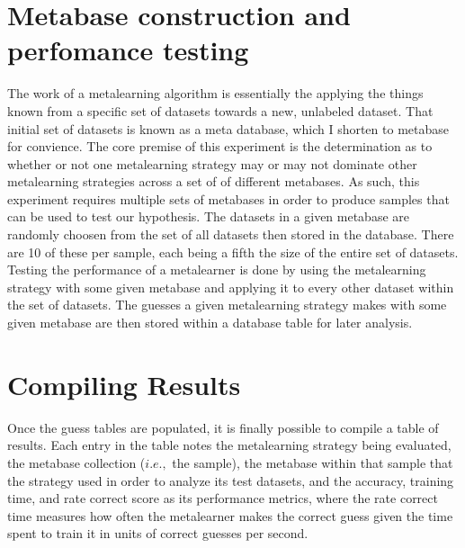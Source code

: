 \section{Metabase construction and perfomance testing}
The work of a metalearning algorithm is essentially the applying the things
known from a specific set of datasets towards a new, unlabeled dataset. That
initial set of datasets is known as a meta database, which I shorten to metabase
for convience. The core premise of this experiment is the determination as to
whether or not one metalearning strategy may or may not dominate other
metalearning strategies across a set of of different metabases. As such, this
experiment requires multiple sets of metabases in order to produce samples
that can be used to test our hypothesis. The datasets in a given metabase are
randomly choosen from the set of all datasets then stored in the database. There
are 10 of these per sample, each being a fifth the size of the entire set of
datasets. Testing the performance of a metalearner is done by using the
metalearning strategy with some given metabase and applying it to every other
dataset within the set of datasets. The guesses a given metalearning strategy
makes with some given metabase are then stored within a database table for later
analysis.

\section{Compiling Results}
Once the guess tables are populated, it is finally possible to compile a table
of results. Each entry in the table notes the metalearning strategy being
evaluated, the metabase collection ($i.e.,$ the sample), the metabase within that
sample that the strategy used in order to analyze its test datasets, and the
accuracy, training time, and rate correct score as its performance metrics,
where the rate correct time measures how often the metalearner makes the correct
guess given the time spent to train it in units of correct guesses per second.
